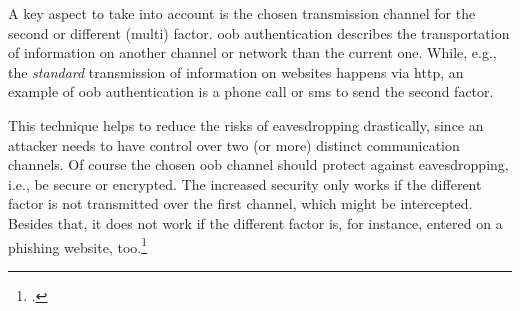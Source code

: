 A key aspect to take into account is the chosen transmission channel for the second or different (multi) factor. \gls{oob} authentication describes the transportation of information on another channel or network than the current one. While, e.g., the \textit{standard} transmission of information on websites happens via \gls{http}, an example of \gls{oob} authentication is a phone call or \gls{sms} to send the second factor.

This technique helps to reduce the risks of eavesdropping drastically, since an attacker needs to have control over two (or more) distinct communication channels. Of course the chosen \gls{oob} channel should protect against eavesdropping, i.e., be secure or encrypted. The increased security only works if the different factor is not transmitted over the first channel, which might be intercepted. Besides that, it does not work if the different factor is, for instance, entered on a phishing website, too.\footcites[See][17]{SP80063B}[See][441]{320284}[See][140]{brotherston2017defensive}[See][106]{2241278}
